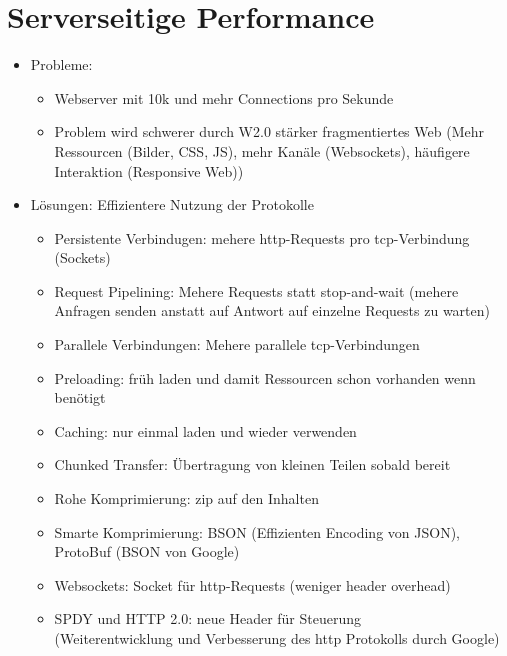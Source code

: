 \documentclass{article} %
\begin{document}
	
\section{Serverseitige Performance}
	\begin{itemize}
		\item Probleme:
		\begin{itemize}
			\item Webserver mit 10k und mehr Connections pro Sekunde
			\item Problem wird schwerer durch W2.0 stärker fragmentiertes Web (Mehr Ressourcen (Bilder, CSS, JS), mehr Kanäle (Websockets), häufigere Interaktion (Responsive Web))
		\end{itemize}
		\item Lösungen: Effizientere Nutzung der Protokolle
		\begin{itemize}
			\item Persistente Verbindugen: mehere http-Requests pro tcp-Verbindung (Sockets)
			\item Request Pipelining: Mehere Requests statt stop-and-wait (mehere Anfragen senden anstatt auf Antwort auf einzelne Requests zu warten)
			\item Parallele Verbindungen: Mehere parallele tcp-Verbindungen
			\item Preloading: früh laden und damit Ressourcen schon vorhanden wenn benötigt
			\item Caching: nur einmal laden und wieder verwenden
			\item Chunked Transfer: Übertragung von kleinen Teilen sobald bereit
			\item Rohe Komprimierung: zip auf den Inhalten
			\item Smarte Komprimierung: BSON (Effizienten Encoding von JSON), ProtoBuf (BSON von Google)
			\item Websockets: Socket für http-Requests (weniger header overhead)
			\item SPDY und HTTP 2.0: neue Header für Steuerung\\
			(Weiterentwicklung und Verbesserung des http Protokolls durch Google)
		\end{itemize}
	\end{itemize}
\end{document}
